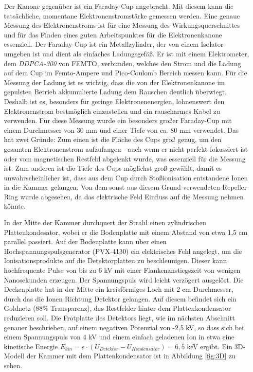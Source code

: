 Der Kanone gegenüber ist ein Faraday-Cup angebracht. Mit diesem kann die tatsächliche, momentane Elektronenstromstärke gemessen werden. Eine genaue Messung des Elektronenstroms ist für eine Messung des Wirkungsquerschnittes und für das Finden eines guten Arbeitspunktes für die Elektronenkanone essenziell. Der Faraday-Cup ist ein Metallzylinder, der von einem Isolator umgeben ist und dient als einfaches Ladungsgefäß. Er ist mit einem Elektrometer, dem \textit{DDPCA-300} von FEMTO, verbunden, welches den Strom und die Ladung auf dem Cup im Femto-Ampere und Pico-Coulomb Bereich messen kann. Für die Messung der Ladung ist es wichtig, dass die von der Elektronenkanone im gepulsten Betrieb akkumulierte Ladung dem Rauschen deutlich überwiegt. Deshalb ist es, besonders für geringe Elektronenenergien, lohnenswert den Elektronenstrom bestmöglich einzustellen und ein rauscharmes Kabel zu verwenden. Für diese Messung wurde ein besonders großer Faraday-Cup mit einem Durchmesser von 30 mm und einer Tiefe von ca. 80 mm verwendet. Das hat zwei Gründe: Zum einen ist die Fläche des Cups groß genug, um den gesamten Elektronenstrom aufzufangen - auch wenn er nicht perfekt fokussiert ist oder vom magnetischen Restfeld abgelenkt wurde, was essenziell für die Messung ist. Zum anderen ist die Tiefe des Cups möglichst groß gewählt, damit es unwahrscheinlicher ist, dass aus dem Cup durch Stoßionisation entstandene Ionen in die Kammer gelangen. Von dem sonst aus diesem Grund verwendeten Repeller-Ring wurde abgesehen, da das elektrische Feld Einfluss auf die Messung nehmen könnte.

In der Mitte der Kammer durchquert der Strahl einen zylindrischen Plattenkondesator, wobei er die Bodenplatte mit einem Abstand von etwa 1,5 cm parallel passiert. Auf der Bodenplatte kann über einen Hochspannungspulsgenerator (PVX-4130) ein elektrisches Feld angelegt, um die Ionisationsprodukte auf die Detektorplatten zu beschleunigen. Dieser kann hochfrequente Pulse von bis zu 6 kV mit einer Flankenanstiegszeit von wenigen Nanosekunden erzeugen. Der Spannungspuls wird leicht verzögert ausgelöst. Die Deckenplatte hat in der Mitte ein kreisförmiges Loch mit 2 cm Durchmesser, durch das die Ionen Richtung Detektor gelangen. Auf diesem befindet sich ein Goldnetz (88\% Transparenz), das Restfelder hinter dem Plattenkondensator reduzieren soll. Die Frotplatte des Detektors liegt, wie im nächsten Abschnitt genauer beschrieben, auf einem negativen Potenzial von -2,5 kV, so dass sich bei einem Spannungspuls von 4 kV und einem einfach geladenen Ion in etwa eine kinetische Energie $E_{kin} = e \cdot (U_{Detektor} - U_{Kondensator}) = 6,5$ keV ergibt. Ein 3D-Modell der Kammer mit dem Plattenkondensator ist in Abbildung \ref{fig:3D} zu sehen.

